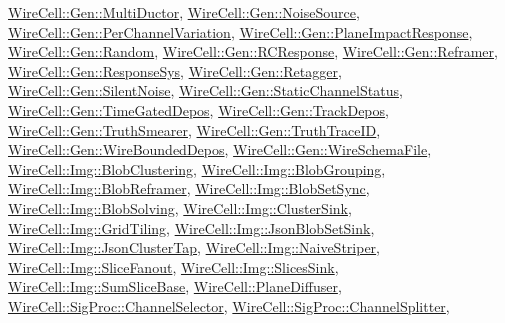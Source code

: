\hyperlink{class_wire_cell_1_1_gen_1_1_multi_ductor}{Wire\+Cell\+::\+Gen\+::\+Multi\+Ductor}, \hyperlink{class_wire_cell_1_1_gen_1_1_noise_source}{Wire\+Cell\+::\+Gen\+::\+Noise\+Source}, \hyperlink{class_wire_cell_1_1_gen_1_1_per_channel_variation}{Wire\+Cell\+::\+Gen\+::\+Per\+Channel\+Variation}, \hyperlink{class_wire_cell_1_1_gen_1_1_plane_impact_response}{Wire\+Cell\+::\+Gen\+::\+Plane\+Impact\+Response}, \hyperlink{class_wire_cell_1_1_gen_1_1_random}{Wire\+Cell\+::\+Gen\+::\+Random}, \hyperlink{class_wire_cell_1_1_gen_1_1_r_c_response}{Wire\+Cell\+::\+Gen\+::\+R\+C\+Response}, \hyperlink{class_wire_cell_1_1_gen_1_1_reframer}{Wire\+Cell\+::\+Gen\+::\+Reframer}, \hyperlink{class_wire_cell_1_1_gen_1_1_response_sys}{Wire\+Cell\+::\+Gen\+::\+Response\+Sys}, \hyperlink{class_wire_cell_1_1_gen_1_1_retagger}{Wire\+Cell\+::\+Gen\+::\+Retagger}, \hyperlink{class_wire_cell_1_1_gen_1_1_silent_noise}{Wire\+Cell\+::\+Gen\+::\+Silent\+Noise}, \hyperlink{class_wire_cell_1_1_gen_1_1_static_channel_status}{Wire\+Cell\+::\+Gen\+::\+Static\+Channel\+Status}, \hyperlink{class_wire_cell_1_1_gen_1_1_time_gated_depos}{Wire\+Cell\+::\+Gen\+::\+Time\+Gated\+Depos}, \hyperlink{class_wire_cell_1_1_gen_1_1_track_depos}{Wire\+Cell\+::\+Gen\+::\+Track\+Depos}, \hyperlink{class_wire_cell_1_1_gen_1_1_truth_smearer}{Wire\+Cell\+::\+Gen\+::\+Truth\+Smearer}, \hyperlink{class_wire_cell_1_1_gen_1_1_truth_trace_i_d}{Wire\+Cell\+::\+Gen\+::\+Truth\+Trace\+ID}, \hyperlink{class_wire_cell_1_1_gen_1_1_wire_bounded_depos}{Wire\+Cell\+::\+Gen\+::\+Wire\+Bounded\+Depos}, \hyperlink{class_wire_cell_1_1_gen_1_1_wire_schema_file}{Wire\+Cell\+::\+Gen\+::\+Wire\+Schema\+File}, \hyperlink{class_wire_cell_1_1_img_1_1_blob_clustering}{Wire\+Cell\+::\+Img\+::\+Blob\+Clustering}, \hyperlink{class_wire_cell_1_1_img_1_1_blob_grouping}{Wire\+Cell\+::\+Img\+::\+Blob\+Grouping}, \hyperlink{class_wire_cell_1_1_img_1_1_blob_reframer}{Wire\+Cell\+::\+Img\+::\+Blob\+Reframer}, \hyperlink{class_wire_cell_1_1_img_1_1_blob_set_sync}{Wire\+Cell\+::\+Img\+::\+Blob\+Set\+Sync}, \hyperlink{class_wire_cell_1_1_img_1_1_blob_solving}{Wire\+Cell\+::\+Img\+::\+Blob\+Solving}, \hyperlink{class_wire_cell_1_1_img_1_1_cluster_sink}{Wire\+Cell\+::\+Img\+::\+Cluster\+Sink}, \hyperlink{class_wire_cell_1_1_img_1_1_grid_tiling}{Wire\+Cell\+::\+Img\+::\+Grid\+Tiling}, \hyperlink{class_wire_cell_1_1_img_1_1_json_blob_set_sink}{Wire\+Cell\+::\+Img\+::\+Json\+Blob\+Set\+Sink}, \hyperlink{class_wire_cell_1_1_img_1_1_json_cluster_tap}{Wire\+Cell\+::\+Img\+::\+Json\+Cluster\+Tap}, \hyperlink{class_wire_cell_1_1_img_1_1_naive_striper}{Wire\+Cell\+::\+Img\+::\+Naive\+Striper}, \hyperlink{class_wire_cell_1_1_img_1_1_slice_fanout}{Wire\+Cell\+::\+Img\+::\+Slice\+Fanout}, \hyperlink{class_wire_cell_1_1_img_1_1_slices_sink}{Wire\+Cell\+::\+Img\+::\+Slices\+Sink}, \hyperlink{class_wire_cell_1_1_img_1_1_sum_slice_base}{Wire\+Cell\+::\+Img\+::\+Sum\+Slice\+Base}, \hyperlink{class_wire_cell_1_1_plane_diffuser}{Wire\+Cell\+::\+Plane\+Diffuser}, \hyperlink{class_wire_cell_1_1_sig_proc_1_1_channel_selector}{Wire\+Cell\+::\+Sig\+Proc\+::\+Channel\+Selector}, \hyperlink{class_wire_cell_1_1_sig_proc_1_1_channel_splitter}{Wire\+Cell\+::\+Sig\+Proc\+::\+Channel\+Splitter}, 